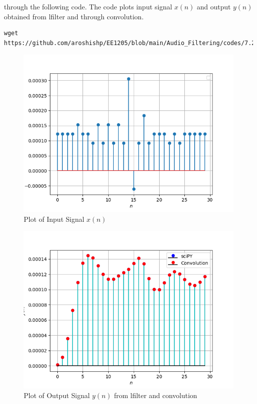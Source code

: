 \documentclass[journal,12pt,twocolumn]{IEEEtran}
\theoremstyle{remark}
\renewcommand\thesection{\arabic{section}}
\numberwithin{equation}{subsection}
\begin{document}
\begin{enumerate}[label=\thesection.\arabic*]
through the following code. The code plots input signal $x(n)$ and output $y(n)$ obtained from lfilter and through convolution.
\begin{lstlisting}
wget https://github.com/aroshishp/EE1205/blob/main/Audio_Filtering/codes/7.2conv.py
\end{lstlisting}
\begin{figure}[!h]
    \centering
    \includegraphics[width = \columnwidth]{figs/input.png}
    \caption{Plot of Input Signal $x(n)$}
    \label{fig:input}
\end{figure}
\begin{figure}[!h]
    \centering
    \includegraphics[width = \columnwidth]{figs/output.png}
    \caption{Plot of Output Signal $y(n)$ from lfilter and convolution}

\end{figure}
\end{enumerate}
\end{document}
